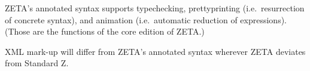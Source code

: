 \documentclass[a4paper,10pt]{article}
\def\Zeta{{\sf Z{\small E}T{\small A}}}
\begin{document}
\Zeta's annotated syntax supports typechecking,
prettyprinting (i.e.\ resurrection of concrete syntax),
and animation (i.e.\ automatic reduction of expressions).
(Those are the functions of the core edition of \Zeta.)

XML mark-up will differ from \Zeta's annotated syntax
wherever \Zeta\cite{Zeta} deviates from Standard Z.

%
%
%
%
%
%
%
%
%
%
%
\end{document}
